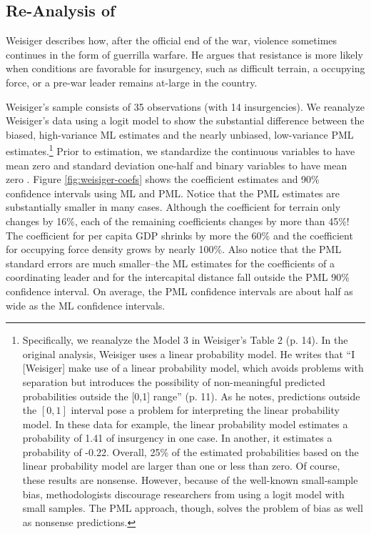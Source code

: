 \documentclass[12pt]{article}
\begin{document}
\begin{appendix}
\section{Re-Analysis of \cite{Weisiger2014}}\label{app:weisiger}

Weisiger describes how, after the official end of the war, violence sometimes continues in the form of guerrilla warfare.
He argues that resistance is more likely when conditions are favorable for insurgency, such as difficult terrain, a occupying force, or a pre-war leader remains at-large in the country.

Weisiger's sample consists of 35 observations (with 14 insurgencies).
We reanalyze Weisiger's data using a logit model to show the substantial difference between the biased, high-variance ML estimates and the nearly unbiased, low-variance PML estimates.\footnote{Specifically, we reanalyze the Model 3 in Weisiger's Table 2 (p. 14).
In the original analysis, Weisiger uses a linear probability model.
He writes that ``I [Weisiger] make use of a linear probability model, which avoids problems with separation but introduces the possibility of non-meaningful predicted probabilities outside the [0,1] range'' (p. 11).
As he notes, predictions outside the $[0, 1]$ interval pose a problem for interpreting the linear probability model.
In these data for example, the linear probability model estimates a probability of 1.41 of insurgency in one case.
In another, it estimates a probability of -0.22.
Overall, 25\% of the estimated probabilities based on the linear probability model are larger than one or less than zero.
Of course, these results are nonsense.
However, because of the well-known small-sample bias, methodologists discourage researchers from using a logit model with small samples.
The PML approach, though, solves the problem of bias as well as nonsense predictions.} Prior to estimation, we standardize the continuous variables to have mean zero and standard deviation one-half and binary variables to have mean zero \citep{Gelman2008}.
Figure \ref{fig:weisiger-coefs} shows the coefficient estimates and 90\% confidence intervals using ML and PML.
Notice that the PML estimates are substantially smaller in many cases.
Although the coefficient for terrain only changes by 16\%, each of the remaining coefficients changes by more than 45\%!
The coefficient for per capita GDP shrinks by more the 60\% and the coefficient for occupying force density grows by nearly 100\%.
Also notice that the PML standard errors are much smaller--the ML estimates for the coefficients of a coordinating leader and for the intercapital distance fall outside the PML 90\% confidence interval.
On average, the PML confidence intervals are about half as wide as the ML confidence intervals.


\end{appendix}
\end{document}
